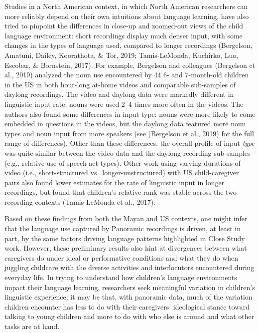\documentclass[,man,floatsintext]{apa6}
\begin{document}
Studies in a North American context, in which North American researchers
can more reliably depend on their own intuitions about language
learning, have also tried to pinpoint the differences in close-up and
zoomed-out views of the child language environment: short recordings
display much denser input, with some changes in the types of language
used, compared to longer recordings (Bergelson, Amatuni, Dailey,
Koorathota, \& Tor, 2019; Tamis-LeMonda, Kuchirko, Luo, Escobar, \&
Bornstein, 2017). For example, Bergelson and colleagues (Bergelson et
al., 2019) analyzed the noun use encountered by 44 6- and 7-month-old
children in the US in both hour-long at-home videos and comparable
sub-samples of daylong recordings. The video and daylong data were
markedly different in linguistic input rate; nouns were used 2--4 times
more often in the videos. The authors also found some differences in
input type: nouns were more likely to come embedded in questions in the
videos, but the daylong data featured more noun types and noun input
from more speakers (see (Bergelson et al., 2019) for the full range of
differences). Other than these differences, the overall profile of input
\emph{type} was quite similar between the video data and the daylong
recording sub-samples (e.g., relative use of speech act types). Other
work using varying durations of video (i.e., short-structured
vs.~longer-unstructured) with US child-caregiver pairs also found lower
estimates for the rate of linguistic input in longer recordings, but
found that children's relative rank was stable across the two recording
contexts (Tamis-LeMonda et al., 2017).

Based on these findings from both the Mayan and US contexts, one might
infer that the language use captured by Panoramic recordings is driven,
at least in part, by the same factors driving language patterns
highlighted in Close Study work. However, these preliminary results also
hint at divergences between what caregivers do under ideal or
performative conditions and what they do when juggling childcare with
the diverse activities and interlocutors encountered during everyday
life. In trying to understand how children's language environments
impact their language learning, researchers seek meaningful variation in
children's linguistic experience; it may be that, with panoramic data,
much of the variation children encounter has less to do with their
caregivers' ideological stance toward talking to young children and more
to do with who else is around and what other tasks are at hand.
\end{document}
